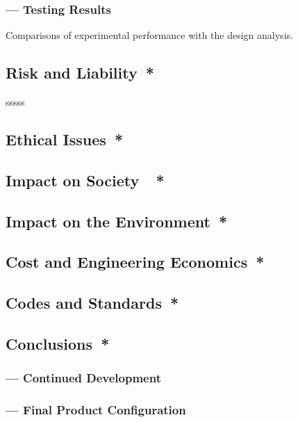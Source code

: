 \documentclass[twocolumn]{article}
\begin{document}
\subsubsection*{ --- Testing Results}Comparisons of experimental performance with the design analysis.

\subsection*{Risk and Liability{{\color{red}\ *}}}
sssss
\subsection*{Ethical Issues{{\color{red}\ *}}}


\subsection*{Impact on Society\color{red}\ {{\color{red}\ *}}}

\subsection*{Impact on the Environment{{\color{red}\ *}}}

\subsection*{Cost and Engineering Economics{{\color{red}\ *}}}

\subsection*{Codes and Standards{{\color{red}\ *}}}

\subsection*{Conclusions{\color{red}\ *}}
\subsubsection*{ --- Continued Development}
\subsubsection*{ --- Final Product Configuration}
\end{document}
